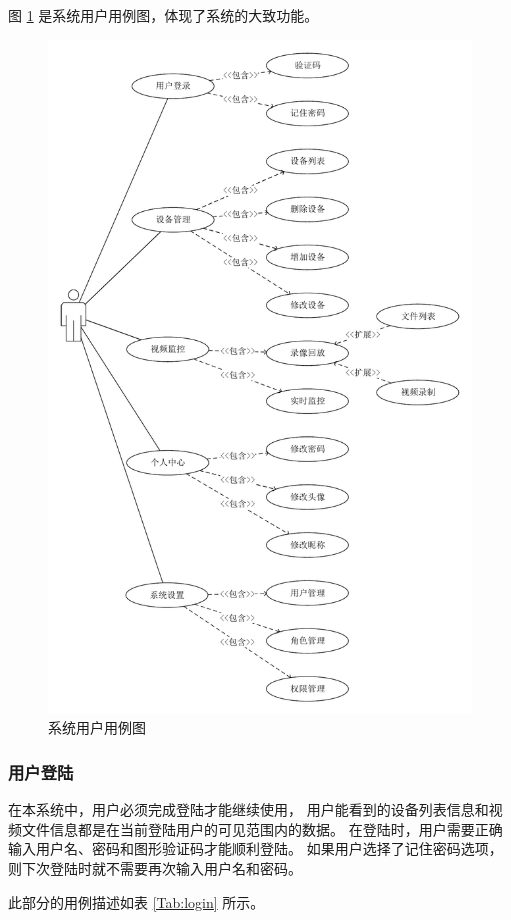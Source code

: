 \newpage
图 \ref{Fig:case} 是系统用户用例图，体现了系统的大致功能。
\begin{figure}[ht]
    \centering   
    \includegraphics[width=.7\linewidth]{./Figure/IMG_case.pdf}
    \caption{系统用户用例图}\label{Fig:case}
\end{figure}

\subsubsection{用户登陆}
在本系统中，用户必须完成登陆才能继续使用，
用户能看到的设备列表信息和视频文件信息都是在当前登陆用户的可见范围内的数据。
在登陆时，用户需要正确输入用户名、密码和图形验证码才能顺利登陆。
如果用户选择了记住密码选项，则下次登陆时就不需要再次输入用户名和密码。

此部分的用例描述如表 \ref{Tab:login} 所示。

